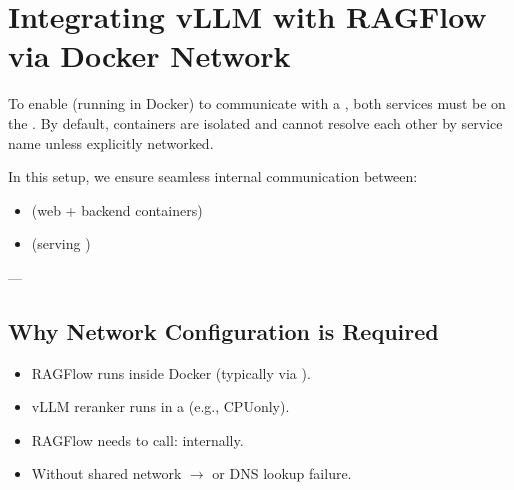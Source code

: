 \documentclass[letterpaper,10pt,english]{sphinxmanual}
\begin{document}
\sphinxstepscope


\chapter{Integrating vLLM with RAGFlow via Docker Network}
\label{\detokenize{vllm-network:integrating-vllm-with-ragflow-via-docker-network}}\label{\detokenize{vllm-network:ragflow-vllm-network}}\label{\detokenize{vllm-network::doc}}
\sphinxAtStartPar
To enable  (running in Docker) to communicate with a , both services must be on the . By default, containers are isolated and cannot resolve each other by service name unless explicitly networked.

\sphinxAtStartPar
In this setup, we ensure seamless internal communication between:
\begin{itemize}
\item {} 
\sphinxAtStartPar
{} (web + backend containers)

\item {} 
\sphinxAtStartPar
{} (serving )

\end{itemize}

\sphinxAtStartPar
—


\section{Why Network Configuration is Required}
\label{\detokenize{vllm-network:why-network-configuration-is-required}}\begin{itemize}
\item {} 
\sphinxAtStartPar
RAGFlow runs inside Docker (typically via ).

\item {} 
\sphinxAtStartPar
vLLM reranker runs in a  (e.g., CPU\sphinxhyphen{}only).

\item {} 
\sphinxAtStartPar
RAGFlow needs to call:  internally.

\item {} 
\sphinxAtStartPar
Without shared network \(\rightarrow\)  or DNS lookup failure.

\end{itemize}
\end{document}
